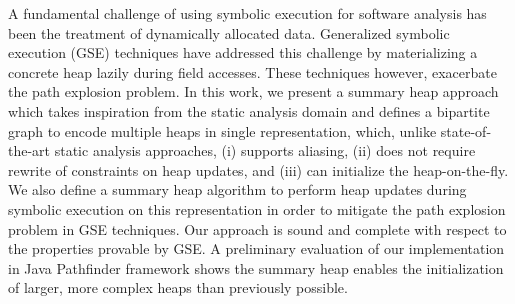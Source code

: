 A fundamental challenge of using symbolic execution for software
analysis has been the treatment of dynamically allocated
data. Generalized symbolic execution (GSE) techniques have addressed
this challenge by materializing a concrete heap lazily during field
accesses.  These techniques however, exacerbate the path explosion
problem.  In this work, we present a summary heap approach which takes
inspiration from the static analysis domain and defines a bipartite
graph to encode multiple heaps in single representation, which, unlike
state-of-the-art static analysis approaches, (i) supports aliasing,
(ii) does not require rewrite of constraints on heap updates, and
(iii) can initialize the heap-on-the-fly. We also define a summary
heap algorithm to perform heap updates during symbolic execution on
this representation in order to mitigate the path explosion problem in
GSE techniques. Our approach is sound and complete with respect to the
properties provable by GSE. A preliminary evaluation of our
implementation in Java Pathfinder framework shows the summary heap
enables the initialization of larger, more complex heaps than
previously possible.

\begin{comment}
A fundamental challenge of using symbolic execution for software
analysis has been the treatment of dynamically allocated data.
State-of-the-art techniques have addressed this challenge through
either (a) the use of summaries that over-approximate possible heaps, or
(b) by materializing a concrete heap lazily during generalized
symbolic execution. In this work, we present a novel heap
initialization and analysis technique which takes inspiration from
both approaches and constructs precise heap summaries lazily during
symbolic execution.  Our approach is 1) \emph{scalable}: it reduces the
points of non-determinism compared to generalized symbolic execution
and explores each control-flow path only once for any given set of
isomorphic heaps, 2) \emph{precise}: at any given point during symbolic
execution, the symbolic heap represents the exact set of feasible
concrete heap structures for the program under analysis, and 3)
\emph{expressive}: the symbolic heap can represent recursive data
structures. We demonstrate the precision and scalability of our
approach by implementing it as an extension to the Symbolic PathFinder
framework for analyzing Java programs.
\end{comment}


